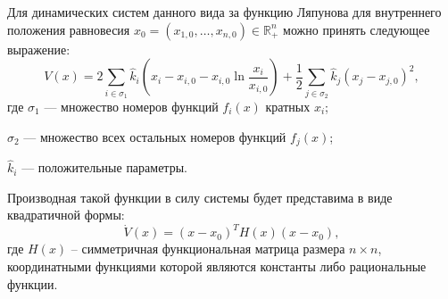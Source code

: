 \documentclass[14pt,a4paper]{extarticle}
\begin{document}
	\begin{theorem}
		Для динамических систем данного  вида за функцию Ляпунова для внутреннего положения равновесия $x_0=(x_{1,0},\dots,x_{n,0})\in\mathbb{R}^n_{+}$ можно принять следующее выражение:
		\[V(x)=2\sum\limits_{i\in\sigma_1}\hat{k}_i\left(x_i-x_{i,0}-x_{i,0}\ln\dfrac{x_i}{x_{i,0}}\right)+\dfrac{1}{2}\sum\limits_{j\in\sigma_2}\hat{k}_j\left(x_j-x_{j,0}\right)^2,\]
		где $\sigma_1$ --- множество номеров функций $f_i(x)$ кратных $x_i$;
		
		$\sigma_2$ --- множество всех остальных номеров функций $f_j(x)$;
		
		$\hat{k}_i$ --- положительные параметры. 
		
		Производная такой функции в силу системы будет представима в виде квадратичной формы:
		\[\dot{V}(x)=(x-x_0)^{T}H(x)(x-x_0),\]
		где $H(x)$ -- симметричная функциональная матрица размера $n\times n$, координатными функциями которой являются константы либо рациональные функции. 
	\end{theorem}
\end{document}

